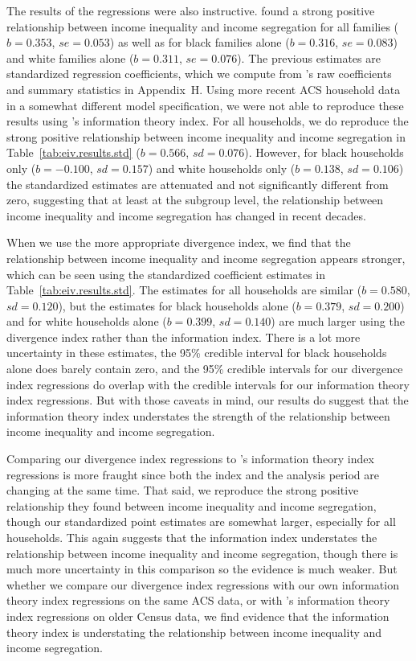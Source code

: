 \documentclass[12pt]{article}
\begin{document}
The results of the regressions were also instructive. \citet{reardon2011income} found a strong positive relationship between income inequality and income segregation for all families ($b = 0.353$, $se = 0.053$) as well as for black families alone ($b=0.316$, $se=0.083$) and white families alone ($b=0.311$, $se=0.076$). The previous estimates are standardized regression coefficients, which we compute from \citet{reardon2011income}'s raw coefficients and summary statistics in Appendix~H. %
Using more recent ACS household data in a somewhat different model specification, we were not able to reproduce these results using \citet{reardon2011income}'s information theory index. For all households, we do reproduce the strong positive relationship between income inequality and income segregation in Table~\ref{tab:eiv.results.std} ($b=0.566$, $sd=0.076$). However, for black households only ($b=-0.100$, $sd=0.157$) and white households only ($b=0.138$, $sd=0.106$) the standardized estimates are attenuated and not significantly different from zero, suggesting that at least at the subgroup level, the relationship between income inequality and income segregation has changed in recent decades.

When we use the more appropriate divergence index, we find that the relationship between income inequality and income segregation appears stronger, which can be seen using the standardized coefficient estimates in Table~\ref{tab:eiv.results.std}. The estimates for all households are similar ($b=0.580$, $sd=0.120$), but the estimates for black households alone ($b=0.379$, $sd=0.200$) and for white households alone ($b=0.399$, $sd=0.140$) are much larger using the divergence index rather than the information index. There is a lot more uncertainty in these estimates, the 95\% credible interval for black households alone does barely contain zero, and the 95\% credible intervals for our divergence index regressions do overlap with the credible intervals for our information theory index regressions. But with those caveats in mind, our results do suggest that the information theory index understates the strength of the relationship between income inequality and income segregation. 

Comparing our divergence index regressions to \citet{reardon2011income}'s information theory index regressions is more fraught since both the index and the analysis period are changing at the same time. That said, we reproduce the strong positive relationship they found between income inequality and income segregation, though our standardized point estimates are somewhat larger, especially for all households. This again suggests that the information index understates the relationship between income inequality and income segregation, though there is much more uncertainty in this comparison so the evidence is much weaker. But whether we compare our divergence index regressions with our own information theory index regressions on the same ACS data, or with \citet{reardon2011income}'s information theory index regressions on older Census data, we find evidence that the information theory index is understating the relationship between income inequality and income segregation.
\end{document}
